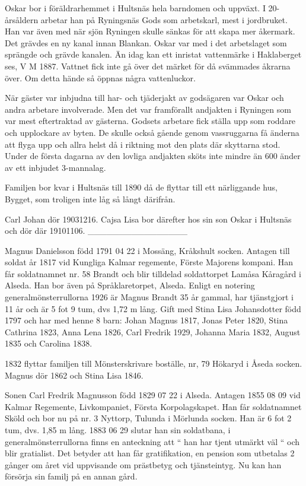 Oskar bor i föräldrarhemmet  i Hultsnäs hela barndomen och uppväxt. I 20-årsåldern arbetar han på Ryningsnäs Gods som arbetskarl, mest i jordbruket. Han var även med när sjön Ryningen skulle sänkas för att skapa mer åkermark. Det grävdes en ny kanal innan Blankan. Oskar var med i det arbetslaget som sprängde och grävde kanalen. Än idag kan ett inristat vattenmärke i Haklaberget ses, V M 1887. Vattnet fick inte gå över det märket för då svämmades åkrarna över. Om detta hände så öppnas några vattenluckor. 


När gäster var inbjudna till har- och tjäderjakt  av godsägaren var Oskar och andra arbetare involverade. Men det var framförallt andjakten i Ryningen som var mest eftertraktad av gästerna. Godsets arbetare fick ställa upp som roddare och upplockare av byten. De skulle också gående genom vassruggarna få änderna att flyga upp och allra helst då i riktning mot den plats där skyttarna stod. Under de första dagarna av den lovliga andjakten sköts inte mindre än 600 änder av ett inbjudet 3-mannalag.


Familjen bor kvar i Hultsnäs till 1890 då de flyttar till ett närliggande hus, Bygget, som troligen inte låg så långt därifrån.


Carl Johan dör 19031216. Cajsa Lisa bor därefter hos sin son Oskar i Hultsnäs och dör där 19101106.
________________



Magnus Danielsson född 1791 04 22 i Mossäng, Kråkshult socken. Antagen till soldat år 1817 vid Kungliga Kalmar regemente, Förste Majorens kompani. Han får soldatnamnet nr. 58 Brandt och blir tilldelad soldattorpet Lamåsa Kåragård i Alseda. Han bor även på Språklaretorpet, Alseda.
Enligt en notering generalmönsterrullorna 1926 är Magnus Brandt 35 år gammal, har tjänstgjort i 11 år och är 5 fot 9 tum, dvs 1,72 m lång. Gift med Stina Lisa Johansdotter född 1797 och har med henne 8 barn: Johan Magnus 1817, Jonas Peter 1820, Stina Cathrina 1823, Anna Lena 1826, Carl Fredrik 1929, Johanna Maria 1832, August 1835 och Carolina 1838.


1832 flyttar familjen till Mönsterskrivare boställe, nr, 79 Hökaryd i Åseda socken.
Magnus dör 1862 och Stina Lisa 1846.


Sonen Carl Fredrik Magnusson född 1829 07 22 i Alseda. Antagen 1855 08 09 vid Kalmar Regemente, Livkompaniet, Första Korpolagskapet. Han får soldatnamnet Sköld och bor nu på nr. 3 Nyttorp, Tulunda i Mörlunda socken. Han är 6 fot 2 tum, dvs. 1,85 m lång.
1883 06 29 slutar han sin soldatbana, i generalmönsterrullorna finns en anteckning att “ han har tjent utmärkt väl “ och blir gratialist. Det betyder att han får gratifikation, en pension som utbetalas 2 gånger om året vid uppvisande om prästbetyg och tjänsteintyg. Nu kan han försörja sin familj på en annan gård.




